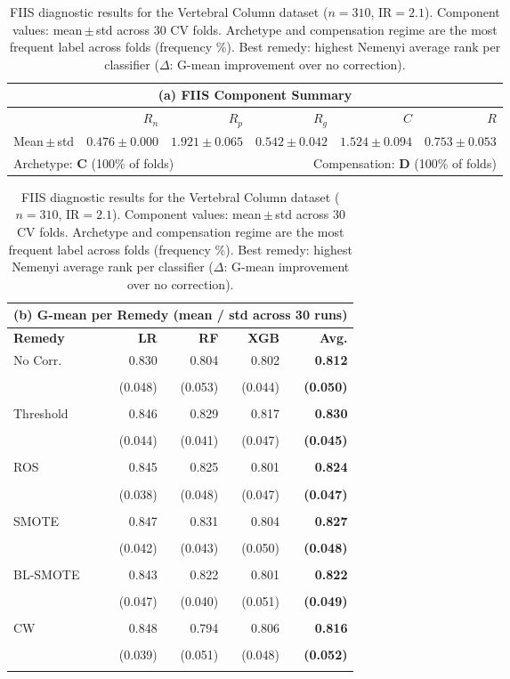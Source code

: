\begin{table}[ht]
\centering
\scriptsize
\caption{FIIS diagnostic results for the Vertebral Column dataset ($n=310$, IR$=2.1$). Component values: mean\,$\pm$\,std across 30 CV folds. Archetype and compensation regime are the most frequent label across folds (frequency \%). Best remedy: highest Nemenyi average rank per classifier ($\Delta$: G-mean improvement over no correction).}
\label{tab:vertebral_diagnostic}
\begin{tabular}{lrrrrr}
\toprule
\multicolumn{6}{c}{\textbf{(a) FIIS Component Summary}} \\
\midrule
& $R_n$ & $R_p$ & $R_g$ & $C$ & $R$ \\
\midrule
    Mean\,$\pm$\,std & $0.476\pm0.000$ & $1.921\pm0.065$ & $0.542\pm0.042$ & $1.524\pm0.094$ & $0.753\pm0.053$ \\
\midrule
\multicolumn{3}{l}{Archetype: \textbf{C} (100\% of folds)} &\multicolumn{3}{r}{Compensation: \textbf{D} (100\% of folds)} \\
\bottomrule
\end{tabular}
\medskip
\begin{tabular}{lrrrr}
\toprule
\multicolumn{5}{c}{\textbf{(b) G-mean per Remedy (mean / std across 30 runs)}} \\
\midrule
\textbf{Remedy} & \textbf{LR} & \textbf{RF} & \textbf{XGB} & \textbf{Avg.} \\
\midrule
    No Corr. & 0.830 & 0.804 & 0.802 & \textbf{0.812} \\\\
    & (0.048) & (0.053) & (0.044) & \textbf{(0.050)} \\\\
\midrule
    Threshold & 0.846 & 0.829 & 0.817 & \textbf{0.830} \\\\
    & (0.044) & (0.041) & (0.047) & \textbf{(0.045)} \\\\
\midrule
    ROS & 0.845 & 0.825 & 0.801 & \textbf{0.824} \\\\
    & (0.038) & (0.048) & (0.047) & \textbf{(0.047)} \\\\
\midrule
    SMOTE & 0.847 & 0.831 & 0.804 & \textbf{0.827} \\\\
    & (0.042) & (0.043) & (0.050) & \textbf{(0.048)} \\\\
\midrule
    BL-SMOTE & 0.843 & 0.822 & 0.801 & \textbf{0.822} \\\\
    & (0.047) & (0.040) & (0.051) & \textbf{(0.049)} \\\\
\midrule
    CW & 0.848 & 0.794 & 0.806 & \textbf{0.816} \\\\
    & (0.039) & (0.051) & (0.048) & \textbf{(0.052)} \\\\
\bottomrule
\end{tabular}
\end{table}
